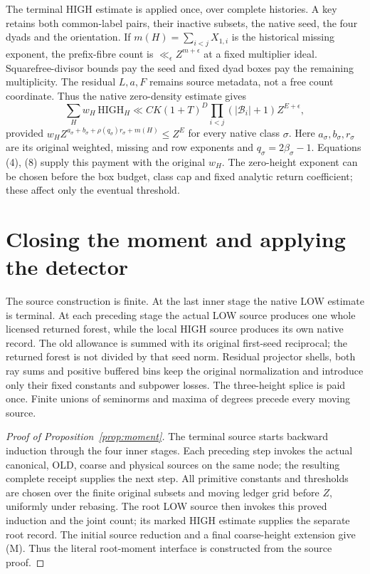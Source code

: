 \documentclass[10pt,a4paper]{article}
\begin{document}
The terminal HIGH estimate is applied once, over complete histories. A key
retains both common-label pairs, their inactive subsets, the native seed,
the four dyads and the orientation. If
$m(H)=\sum_{i<j}X_{1,i}$ is the historical missing exponent, the prefix-fibre
count is $\ll_\epsilon Z^{m+\epsilon}$ at a fixed multiplier ideal.
Squarefree-divisor bounds pay the seed and fixed dyad boxes pay the remaining
multiplicity. The residual $L,a,F$ remains source metadata, not a free count
coordinate. Thus the native zero-density estimate gives
\[
 \sum_H w_H\,\mathrm{HIGH}_H
 \ll C K(1+T)^D\!\prod_{i<j}(|\mathcal B_i|+1)Z^{E+\epsilon}, \tag{10}
\]
provided $w_H Z^{a_\sigma+b_\sigma+\rho(q_\sigma)r_\sigma+m(H)}\le Z^E$
for every native class $\sigma$. Here $a_\sigma,b_\sigma,r_\sigma$ are its
original weighted, missing and row exponents and $q_\sigma=2\beta_\sigma-1$.
Equations (4), (8) supply this payment with the original $w_H$.
The zero-height exponent can be chosen before the box budget, class cap and
fixed analytic return coefficient; these affect only the eventual threshold.

\newpage
\section{Closing the moment and applying the detector}
The source construction is finite. At the last inner stage the native LOW
estimate is terminal. At each preceding stage the actual LOW source produces
one whole licensed returned forest, while the local HIGH source produces its
own native record. The old allowance is summed with its original first-seed
reciprocal; the returned forest is not divided by that seed norm. Residual
projector shells, both ray sums and positive buffered bins keep the original
normalization and introduce only their fixed constants and subpower losses.
The three-height splice is paid once. Finite unions of seminorms and maxima
of degrees precede every moving source.

\begin{proof}[Proof of Proposition~\ref{prop:moment}]
The terminal source starts backward induction through the four inner stages.
Each preceding step invokes the actual canonical, OLD, coarse and physical
sources on the same node; the resulting complete receipt supplies the next
step. All primitive constants and thresholds are chosen over the finite
original subsets and moving ledger grid before $Z$, uniformly under rebasing.
The root LOW source then invokes this proved induction and the joint count;
its marked HIGH estimate supplies the separate root record. The initial
source reduction and a final coarse-height extension give (M). Thus the
literal root-moment interface is constructed from the source proof.
\end{proof}
\end{document}
